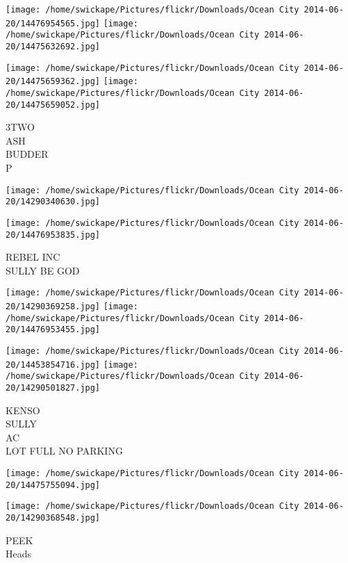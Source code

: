 \documentclass[10pt,letterpaper]{article}
\begin{document}
\texttt{[image: /home/swickape/Pictures/flickr/Downloads/Ocean City 2014-06-20/14476954565.jpg]}
\texttt{[image: /home/swickape/Pictures/flickr/Downloads/Ocean City 2014-06-20/14475632692.jpg]}

\texttt{[image: /home/swickape/Pictures/flickr/Downloads/Ocean City 2014-06-20/14475659362.jpg]}
\texttt{[image: /home/swickape/Pictures/flickr/Downloads/Ocean City 2014-06-20/14475659052.jpg]}

3TWO\\
ASH\\
BUDDER\\
P\\
\pagebreak

\texttt{[image: /home/swickape/Pictures/flickr/Downloads/Ocean City 2014-06-20/14290340630.jpg]}

\vspace{0.25in}
\texttt{[image: /home/swickape/Pictures/flickr/Downloads/Ocean City 2014-06-20/14476953835.jpg]}

REBEL INC\\
SULLY BE GOD\\
\pagebreak

\texttt{[image: /home/swickape/Pictures/flickr/Downloads/Ocean City 2014-06-20/14290369258.jpg]}
\texttt{[image: /home/swickape/Pictures/flickr/Downloads/Ocean City 2014-06-20/14476953455.jpg]}

\texttt{[image: /home/swickape/Pictures/flickr/Downloads/Ocean City 2014-06-20/14453854716.jpg]}
\texttt{[image: /home/swickape/Pictures/flickr/Downloads/Ocean City 2014-06-20/14290501827.jpg]}

KENSO\\
SULLY\\
AC\\
LOT FULL NO PARKING\\
\pagebreak

\texttt{[image: /home/swickape/Pictures/flickr/Downloads/Ocean City 2014-06-20/14475755094.jpg]}

\vspace{0.25in}
\texttt{[image: /home/swickape/Pictures/flickr/Downloads/Ocean City 2014-06-20/14290368548.jpg]}

PEEK\\
Heads\\
\pagebreak
\end{document}
